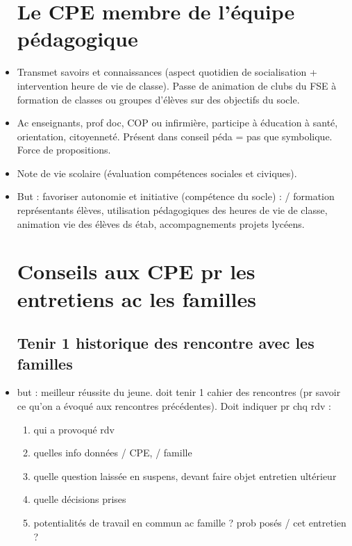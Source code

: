 \documentclass[12pt]{report}
\begin{document}
\begin{itemize}
\section{Le CPE membre de l'équipe pédagogique}

\item Transmet savoirs et connaissances (aspect quotidien de socialisation +  intervention heure de vie de classe). Passe de animation de clubs du FSE à formation de classes ou groupes d'élèves sur des objectifs du socle.\\

\item Ac enseignants, prof doc, COP ou infirmière, participe à éducation à santé, orientation, citoyenneté. Présent dans conseil péda = pas que symbolique. Force de propositions. \\

\item Note de vie scolaire (évaluation compétences sociales et civiques).\\

\item But : favoriser autonomie et initiative (compétence du socle) : / formation représentants élèves, utilisation pédagogiques des heures de vie de classe, animation vie des élèves ds étab, accompagnements projets lycéens.\\

\section{Conseils aux CPE pr les entretiens ac les familles}

\subsection{Tenir 1 historique des rencontre avec les familles}

\item but : meilleur réussite du jeune. doit tenir 1 cahier des rencontres (pr savoir ce qu'on a évoqué aux rencontres précédentes). Doit indiquer pr chq rdv : 
\begin{enumerate}
\item qui a provoqué rdv \\
\item quelles info données / CPE, / famille \\
\item quelle question laissée en suspens, devant faire objet entretien ultérieur \\
\item quelle décisions prises \\
\item potentialités de travail en commun ac famille ? prob posés / cet entretien ? \\
\end{enumerate}


\end{itemize}
\end{document}
